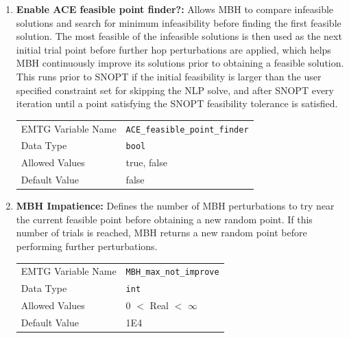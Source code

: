 \begin{enumerate}
    \item \textbf{Enable ACE feasible point finder?:} Allows \ac{MBH} to compare infeasible solutions and search for minimum infeasibility before finding the first feasible solution. The most feasible of the infeasible solutions is then used as the next initial trial point before further hop perturbations are applied, which helps \ac{MBH} continuously improve its solutions prior to obtaining a feasible solution. This runs prior to \ac{SNOPT} if the initial feasibility is larger than the user specified constraint set for skipping the \ac{NLP} solve, and after \ac{SNOPT} every iteration until a point satisfying the \ac{SNOPT} feasibility tolerance is satisfied.
    \begin{table}[H]
        \hspace{2cm}
        \begin{tabular}{lp{5cm}}
        \ac{EMTG} Variable Name & \verb|ACE_feasible_point_finder| \\
        Data Type & \verb|bool| \\
        Allowed Values & true, false \\
        Default Value & false \\
        \end{tabular}
    \end{table}
    
    \item \textbf{\ac{MBH} Impatience:} Defines the number of \ac{MBH} perturbations to try near the current feasible point before obtaining a new random point. If this number of trials is reached, \ac{MBH} returns a new random point before performing further perturbations.
    \begin{table}[H]
        \hspace{2cm}
        \begin{tabular}{lp{5cm}}
        \ac{EMTG} Variable Name & \verb|MBH_max_not_improve| \\
        Data Type & \verb|int| \\
        Allowed Values & $0$ $<$ Real $<$ $\infty$ \\
        Default Value & 1E4 \\
        \end{tabular}
    \end{table}
    

\end{enumerate}
